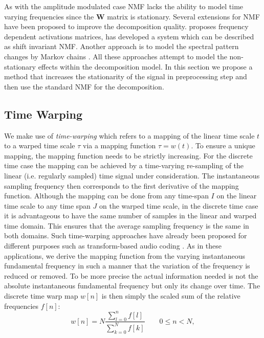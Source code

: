 As with the amplitude modulated case NMF lacks the ability to model time varying frequencies since the $\mathbf{W}$ matrix is stationary.
Several extensions for NMF have been proposed to improve the decomposition quality.
\cite{hennequin11} proposes frequency dependent activations matrices, \cite{smaragdis08} has developed a system which can be described as shift invariant NMF.
Another approach is to model the spectral pattern changes by Markov chains \cite{nakano10}. All these approaches attempt to model the non-stationary effects within the decomposition model.
In this section we propose a method that increases the stationarity of the signal in preprocessing step and then use the standard NMF for the decomposition. \\

\subsection{Time Warping}
\label{sub:time_warping}
We make use of \emph{time-warping} which refers to a mapping of the linear time scale $t$ to a warped time scale $\tau$ via a mapping function $\tau=w(t)$.
To ensure a unique mapping, the mapping function needs to be strictly increasing.
For the discrete time case the mapping can be achieved by a time-varying re-sampling of the linear (i.e. regularly sampled) time signal under consideration.
The instantaneous sampling frequency then corresponds to the first derivative of
the mapping function. Although the mapping can be done from any time-span
$I$ on the linear time scale to any time span $J$ on the warped time scale, in
the discrete time case it is advantageous to have the same number of samples
in the linear and warped time domain. This ensures that the average sampling
frequency is the same in both domains. Such time-warping approaches have already
been proposed for different purposes such as transform-based audio coding
\cite{edler09}. As in these applications, we derive the mapping function from
the varying instantaneous fundamental frequency in such a manner that the variation of the frequency is
reduced or removed. To be more precise the actual information needed is not
the absolute instantaneous fundamental frequency but only its change over time.
The discrete time warp map $w[n]$ is then simply the scaled sum of the relative
frequencies $f[n]$:
\begin{equation}
w[n]=N \frac{\sum^n_{l=0}{f[l]}}{\sum^N_{k=0}{f[k]}}  \qquad 0\leq n<N,
\end{equation}
